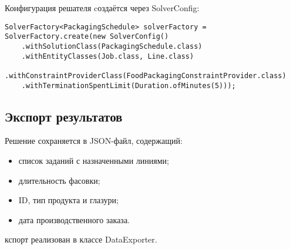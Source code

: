 Конфигурация решателя cоздаётся через SolverConfig:
\vspace{5cm}
\begin{lstlisting}[caption={SolverConfig}, label={lst:example}]
SolverFactory<PackagingSchedule> solverFactory = SolverFactory.create(new SolverConfig()
    .withSolutionClass(PackagingSchedule.class)
    .withEntityClasses(Job.class, Line.class)
    .withConstraintProviderClass(FoodPackagingConstraintProvider.class)
    .withTerminationSpentLimit(Duration.ofMinutes(5)));
\end{lstlisting}

\subsection{Экспорт результатов}

Решение сохраняется в JSON-файл, содержащий:

\begin{itemize}
    \item список заданий с назначенными линиями;
    \item длительность фасовки;
    \item ID, тип продукта и глазури;
    \item дата производственного заказа.
\end{itemize}

кспорт реализован в классе DataExporter.


